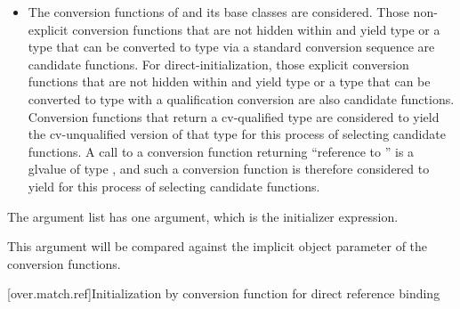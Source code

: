 \begin{itemize}
\item
The conversion functions of
and its base classes are considered.
Those non-explicit conversion functions that are not hidden
within
and yield type
or a type that can be converted to type
via a standard conversion sequence
are candidate functions.
For direct-initialization, those explicit conversion functions that are not
hidden within  and yield type  or a type that can be converted
to type  with a qualification conversion are also
candidate functions.
Conversion functions that return a cv-qualified type
are considered to yield the cv-unqualified version of that type
for this process of selecting candidate functions.
A call to a conversion function returning ``reference to ''
is a glvalue of type , and such a conversion function is
therefore considered to yield  for this process of selecting
candidate functions.
\end{itemize}

\pnum
The argument list has one argument, which is the initializer expression.
\begin{note}
This argument will be compared against
the implicit object parameter of the conversion functions.
\end{note}

[over.match.ref]{Initialization by conversion function for direct reference binding}%

